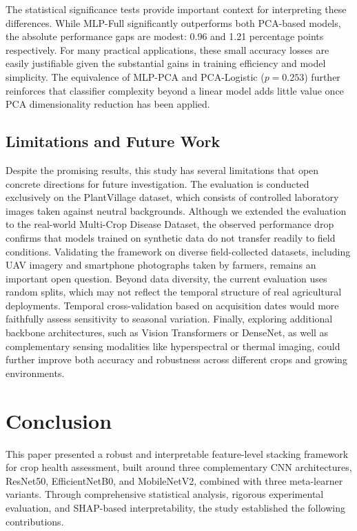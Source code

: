 \documentclass[pdflatex,sn-basic]{sn-jnl}
\begin{document}
The statistical significance tests provide important context for interpreting these differences. While MLP-Full significantly outperforms both PCA-based models, the absolute performance gaps are modest: 0.96 and 1.21 percentage points respectively. For many practical applications, these small accuracy losses are easily justifiable given the substantial gains in training efficiency and model simplicity. The equivalence of MLP-PCA and PCA-Logistic ($p = 0.253$) further reinforces that classifier complexity beyond a linear model adds little value once PCA dimensionality reduction has been applied.

\subsection{Limitations and Future Work}

Despite the promising results, this study has several limitations that open concrete directions for future investigation. The evaluation is conducted exclusively on the PlantVillage dataset, which consists of controlled laboratory images taken against neutral backgrounds. Although we extended the evaluation to the real-world Multi-Crop Disease Dataset, the observed performance drop confirms that models trained on synthetic data do not transfer readily to field conditions. Validating the framework on diverse field-collected datasets, including UAV imagery and smartphone photographs taken by farmers, remains an important open question. Beyond data diversity, the current evaluation uses random splits, which may not reflect the temporal structure of real agricultural deployments. Temporal cross-validation based on acquisition dates would more faithfully assess sensitivity to seasonal variation. Finally, exploring additional backbone architectures, such as Vision Transformers or DenseNet, as well as complementary sensing modalities like hyperspectral or thermal imaging, could further improve both accuracy and robustness across different crops and growing environments.

\section{Conclusion}
\label{sec:conclusion}

This paper presented a robust and interpretable feature-level stacking framework for crop health assessment, built around three complementary CNN architectures, ResNet50, EfficientNetB0, and MobileNetV2, combined with three meta-learner variants. Through comprehensive statistical analysis, rigorous experimental evaluation, and SHAP-based interpretability, the study established the following contributions.
\end{document}
